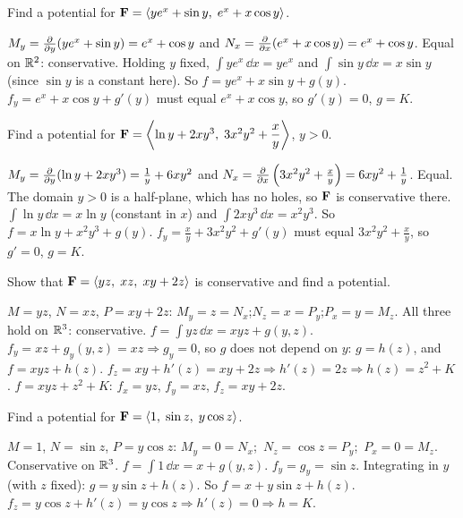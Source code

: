 \begin{problem}\label{q:pot2c}
Find a potential for $\mathbf{F}=\left\langle ye^x+\sin y,\;e^x+x\cos y \right\rangle$.
\end{problem}
\begin{solution}
 $M_y=\frac{\partial }{\partial y}(ye^x+\sin y)=e^x+\cos y$ and $N_x=\frac{\partial }{\partial x}(e^x+x\cos y)=e^x+\cos y$.
Equal on $\mathbb{R}^2$: conservative.
 Holding $y$ fixed, $\int ye^x\,\dd x=ye^x$ and
$\int\sin y\,\dd x=x\sin y$ (since $\sin y$ is a constant here). So $f=ye^x+x\sin y+g(y)$.
 $f_y=e^x+x\cos y+g'(y)$ must equal $e^x+x\cos y$, so $g'(y)=0$, $g=K$.
\end{solution}

\begin{problem}\label{q:pot2d}
Find a potential for $\mathbf{F}=\left\langle \ln y+2xy^3,\;3x^2y^2+\dfrac xy \right\rangle$, $y>0$.
\end{problem}
\begin{solution}
 $M_y=\frac{\partial }{\partial y}(\ln y+2xy^3)=\frac1y+6xy^2$ and
$N_x=\frac{\partial }{\partial x}\left(3x^2y^2+\frac xy\right)=6xy^2+\frac1y$. Equal. The domain $y>0$ is a half-plane,
which has no holes, so $\mathbf{F}$ is conservative there.
 $\int\ln y\,\dd x=x\ln y$ (constant in $x$) and $\int2xy^3\,\dd x=x^2y^3$.
So $f=x\ln y+x^2y^3+g(y)$.
 $f_y=\frac xy+3x^2y^2+g'(y)$ must equal $3x^2y^2+\frac xy$, so $g'=0$, $g=K$.
\end{solution}

\begin{problem}\label{q:pot3a}
Show that $\mathbf{F}=\left\langle yz,\;xz,\;xy+2z \right\rangle$ is conservative and find a potential.
\end{problem}
\begin{solution}
 $M=yz$, $N=xz$, $P=xy+2z$:
$M_y=z=N_x$;\quad $N_z=x=P_y$;\quad $P_x=y=M_z$. All three hold on $\mathbb{R}^3$: conservative.
 $f=\int yz\,\dd x=xyz+g(y,z)$.
 $f_y=xz+g_y(y,z)=xz\Rightarrow g_y=0$, so $g$ does not
depend on $y$: $g=h(z)$, and $f=xyz+h(z)$.
 $f_z=xy+h'(z)=xy+2z\Rightarrow h'(z)=2z\Rightarrow h(z)=z^2+K$.
 $f=xyz+z^2+K$: $f_x=yz$, $f_y=xz$, $f_z=xy+2z$.\checkok
{}
\end{solution}

\begin{problem}\label{q:pot3b}
Find a potential for $\mathbf{F}=\left\langle 1,\;\sin z,\;y\cos z \right\rangle$.
\end{problem}
\begin{solution}
 $M=1$, $N=\sin z$, $P=y\cos z$: $M_y=0=N_x$;\ $N_z=\cos z=P_y$;\ $P_x=0=M_z$.
Conservative on $\mathbb{R}^3$.
 $f=\int1\,\dd x=x+g(y,z)$.
 $f_y=g_y=\sin z$. Integrating in $y$ (with $z$ fixed):
$g=y\sin z+h(z)$. So $f=x+y\sin z+h(z)$.
 $f_z=y\cos z+h'(z)=y\cos z\Rightarrow h'(z)=0\Rightarrow h=K$.
\end{solution}

